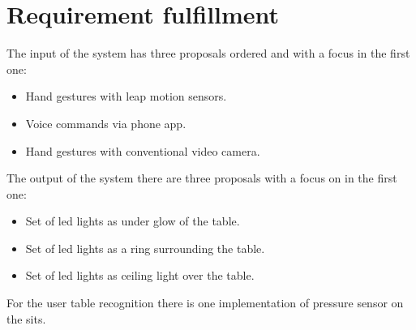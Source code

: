 \documentclass{article}
\begin{document}
\section{Requirement fulfillment}
The input of the system has three proposals ordered and with a focus in the first one:
\begin{itemize}
    \item Hand gestures with leap motion sensors.
    \item Voice commands via phone app.
    \item Hand gestures with conventional video camera.
\end{itemize}
The output of the system there are three proposals with a focus on in the first one:
\begin{itemize}
    \item Set of led lights as under glow of the table.
    \item Set of led lights as a ring surrounding the table.
    \item Set of led lights as ceiling light over the table.
\end{itemize}
For the user table recognition there is one implementation of pressure sensor on the sits.

\end{document}
